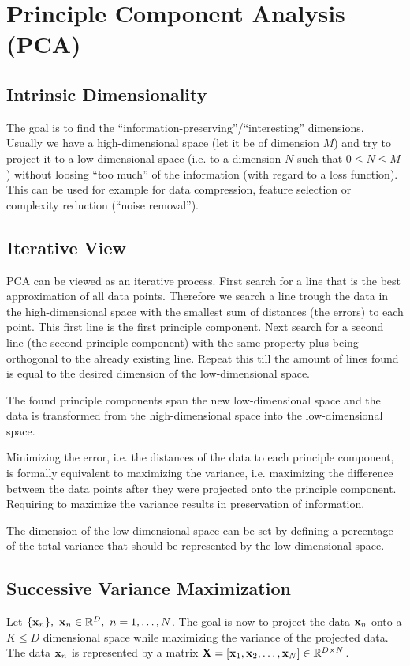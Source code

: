 \chapter{Principle Component Analysis (PCA)}

\section{Intrinsic Dimensionality}
The goal is to find the ``information-preserving''/``interesting'' dimensions. Usually we have a high-dimensional space (let it be of dimension \(M\)) and try to project it to a low-dimensional space (i.e. to a dimension \(N\) such that \(0 \leq N \leq M\)) without loosing ``too much'' of the information (with regard to a loss function). This can be used for example for data compression, feature selection or complexity reduction (``noise removal'').

\section{Iterative View}
PCA can be viewed as an iterative process. First search for a line that is the best approximation of all data points. Therefore we search a line trough the data in the high-dimensional space with the smallest sum of distances (the errors) to each point. This first line is the first principle component. Next search for a second line (the second principle component) with the same property plus being orthogonal to the already existing line. Repeat this till the amount of lines found is equal to the desired dimension of the low-dimensional space.

The found principle components span the new low-dimensional space and the data is transformed from the high-dimensional space into the low-dimensional space.

Minimizing the error, i.e. the distances of the data to each principle component, is formally equivalent to maximizing the variance, i.e. maximizing the difference between the data points after they were projected onto the principle component. Requiring to maximize the variance results in preservation of information.

The dimension of the low-dimensional space can be set by defining a percentage of the total variance that should be represented by the low-dimensional space.

\section{Successive Variance Maximization}
Let \(\{\matr{x}_n\},\ \matr{x}_n \in \R^D,\ n = 1, \ldots, N\). The goal is now to project the data \(\boldsymbol{\mathrm{x}}_n\) onto a \(K \leq D\) dimensional space while maximizing the variance of the projected data. The data \(\boldsymbol{\mathrm{x}}_n\) is represented by a matrix \(\boldsymbol{\mathrm{X}} = [\boldsymbol{\mathrm{x}}_1, \boldsymbol{\mathrm{x}}_2, \ldots, \boldsymbol{\mathrm{x}}_N] \in \mathbb{R}^{D \times N}\).

